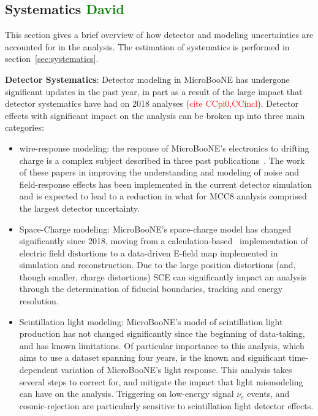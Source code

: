 \documentclass[a4paper]{article}
\begin{document}
\subsection{Systematics  \textcolor{green}{David}}
\par This section gives a brief overview of how detector and modeling uncertainties are accounted for in the analysis. The estimation of systematics is performed in section~\ref{sec:systematics}.
\par \noindent \textbf{Detector Systematics}: Detector modeling in MicroBooNE has undergone significant updates in the past year, in part as a result of the large impact that detector systematics have had on 2018 analyses (\textcolor{red}{cite CCpi0,CCincl}). Detector effects with significant impact on the analysis can be broken up into three main categories:
\begin{itemize}
    \item wire-response modeling: the response of MicroBooNE's electronics to drifting charge is a complex subject described in three past publications~\cite{bib:noise,bib:SP1,bib:SP2}. The work of these papers in improving the understanding and modeling of noise and field-response effects has been implemented in the current detector simulation and is expected to lead to a reduction in what for MCC8 analysis comprised the largest detector uncertainty.
    \item Space-Charge modeling: MicroBooNE's space-charge model has changed significantly since 2018, moving from a calculation-based~\cite{bib:SCETN} implementation of electric field distortions to a data-driven E-field map implemented in simulation and reconstruction. Due to the large position distortions (and, though smaller, charge distortions) SCE can significantly impact an analysis through the determination  of fiducial boundaries, tracking and energy resolution.
    \item Scintillation light modeling: MicroBooNE's model of scintillation light production has not changed significantly since the beginning of data-taking, and has known limitations. Of particular importance to this analysis, which aims to use a dataset spanning four years, is the known and significant time-dependent variation of MicroBooNE's light response. This analysis takes several steps to correct for, and mitigate the impact that light mismodeling can have on the analysis. Triggering on low-energy signal $\nu_e$ events, and cosmic-rejection are particularly sensitive to scintillation light detector effects.
\end{itemize}{}
\end{document}
